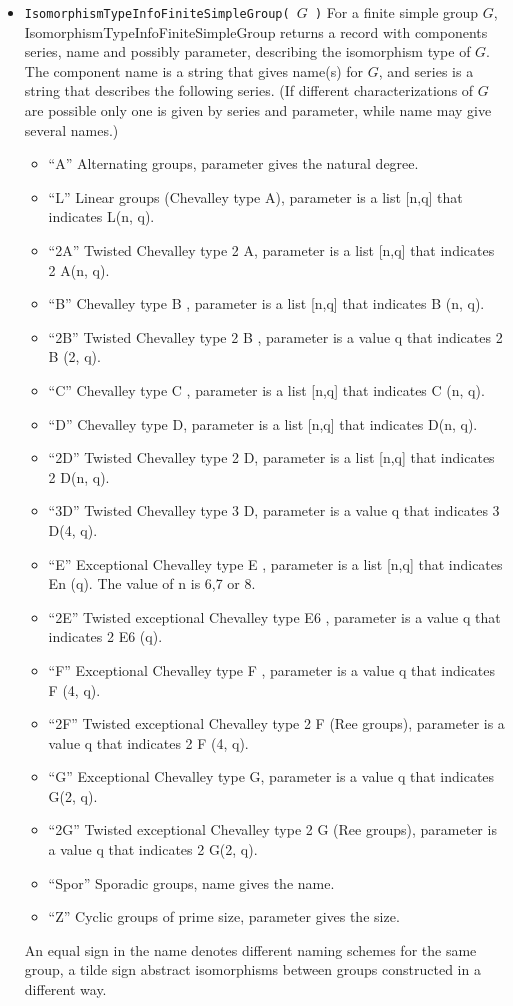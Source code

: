 \begin{itemize}
\item\protect\footnotemark
{}
{\tt IsomorphismTypeInfoFiniteSimpleGroup( $G$ )}
For a finite simple group $G$, IsomorphismTypeInfoFiniteSimpleGroup returns a record with components
series, name and possibly parameter, describing the isomorphism type of $G$. The component name is a
string that gives name(s) for $G$, and series is a string that describes the following series.
(If different characterizations of $G$ are possible only one is given by series and parameter, while name may
give several names.)
\begin{itemize}
\item 
``A'' Alternating groups, parameter gives the natural degree.
\item 
``L'' Linear groups (Chevalley type A), parameter is a list [n,q] that indicates L(n, q).
\item 
``2A'' Twisted Chevalley type 2 A, parameter is a list [n,q] that indicates 2 A(n, q).
\item 
``B'' Chevalley type B , parameter is a list [n,q] that indicates B (n, q).
\item 
``2B'' Twisted Chevalley type 2 B , parameter is a value q that indicates 2 B (2, q).
\item 
``C'' Chevalley type C , parameter is a list [n,q] that indicates C (n, q).
\item 
``D'' Chevalley type D, parameter is a list [n,q] that indicates D(n, q).
\item 
``2D'' Twisted Chevalley type 2 D, parameter is a list [n,q] that indicates 2 D(n, q).
\item 
``3D'' Twisted Chevalley type 3 D, parameter is a value q that indicates 3 D(4, q).
\item 
``E'' Exceptional Chevalley type E , parameter is a list [n,q] that indicates En (q). The value of n is 6,7 or 8.
\item 
``2E'' Twisted exceptional Chevalley type E6 , parameter is a value q that indicates 2 E6 (q).
\item 
``F'' Exceptional Chevalley type F , parameter is a value q that indicates F (4, q).
\item 
``2F'' Twisted exceptional Chevalley type 2 F (Ree groups), parameter is a value q that indicates 2 F (4, q).
\item 
``G'' Exceptional Chevalley type G, parameter is a value q that indicates G(2, q).
\item 
``2G'' Twisted exceptional Chevalley type 2 G (Ree groups), parameter is a value q that indicates 2 G(2, q).
\item 
``Spor'' Sporadic groups, name gives the name.
\item 
``Z'' Cyclic groups of prime size, parameter gives the size.
\end{itemize}
An equal sign in the name denotes different naming schemes for the same group, a tilde sign abstract
isomorphisms between groups constructed in a different way.

\end{itemize}
